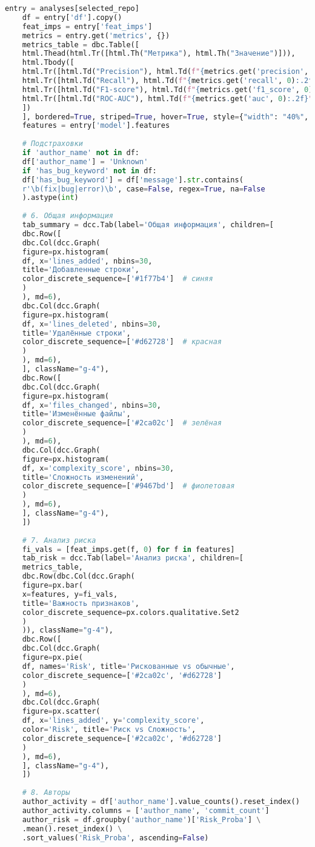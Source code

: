 \begin{lstlisting}[language=Python, caption={{ \texttt{app.py}}}]
	entry = analyses[selected_repo]
	df = entry['df'].copy()
	feat_imps = entry['feat_imps']
	metrics = entry.get('metrics', {})
	metrics_table = dbc.Table([
	html.Thead(html.Tr([html.Th("Метрика"), html.Th("Значение")])),
	html.Tbody([
	html.Tr([html.Td("Precision"), html.Td(f"{metrics.get('precision', 0):.2f}")]),
	html.Tr([html.Td("Recall"), html.Td(f"{metrics.get('recall', 0):.2f}")]),
	html.Tr([html.Td("F1-score"), html.Td(f"{metrics.get('f1_score', 0):.2f}")]),
	html.Tr([html.Td("ROC-AUC"), html.Td(f"{metrics.get('auc', 0):.2f}")]),
	])
	], bordered=True, striped=True, hover=True, style={"width": "40%", "marginTop": "20px"})
	features = entry['model'].features
	
	# Подстраховки
	if 'author_name' not in df:
	df['author_name'] = 'Unknown'
	if 'has_bug_keyword' not in df:
	df['has_bug_keyword'] = df['message'].str.contains(
	r'\b(fix|bug|error)\b', case=False, regex=True, na=False
	).astype(int)
	
	# 6. Общая информация
	tab_summary = dcc.Tab(label='Общая информация', children=[
	dbc.Row([
	dbc.Col(dcc.Graph(
	figure=px.histogram(
	df, x='lines_added', nbins=30,
	title='Добавленные строки',
	color_discrete_sequence=['#1f77b4']  # синяя
	)
	), md=6),
	dbc.Col(dcc.Graph(
	figure=px.histogram(
	df, x='lines_deleted', nbins=30,
	title='Удалённые строки',
	color_discrete_sequence=['#d62728']  # красная
	)
	), md=6),
	], className="g-4"),
	dbc.Row([
	dbc.Col(dcc.Graph(
	figure=px.histogram(
	df, x='files_changed', nbins=30,
	title='Изменённые файлы',
	color_discrete_sequence=['#2ca02c']  # зелёная
	)
	), md=6),
	dbc.Col(dcc.Graph(
	figure=px.histogram(
	df, x='complexity_score', nbins=30,
	title='Сложность изменений',
	color_discrete_sequence=['#9467bd']  # фиолетовая
	)
	), md=6),
	], className="g-4"),
	])
	
	# 7. Анализ риска
	fi_vals = [feat_imps.get(f, 0) for f in features]
	tab_risk = dcc.Tab(label='Анализ риска', children=[
	metrics_table,
	dbc.Row(dbc.Col(dcc.Graph(
	figure=px.bar(
	x=features, y=fi_vals,
	title='Важность признаков',
	color_discrete_sequence=px.colors.qualitative.Set2
	)
	)), className="g-4"),
	dbc.Row([
	dbc.Col(dcc.Graph(
	figure=px.pie(
	df, names='Risk', title='Рискованные vs обычные',
	color_discrete_sequence=['#2ca02c', '#d62728']
	)
	), md=6),
	dbc.Col(dcc.Graph(
	figure=px.scatter(
	df, x='lines_added', y='complexity_score',
	color='Risk', title='Риск vs Сложность',
	color_discrete_sequence=['#2ca02c', '#d62728']
	)
	), md=6),
	], className="g-4"),
	])
	
	# 8. Авторы
	author_activity = df['author_name'].value_counts().reset_index()
	author_activity.columns = ['author_name', 'commit_count']
	author_risk = df.groupby('author_name')['Risk_Proba'] \
	.mean().reset_index() \
	.sort_values('Risk_Proba', ascending=False)
	

\end{lstlisting}
